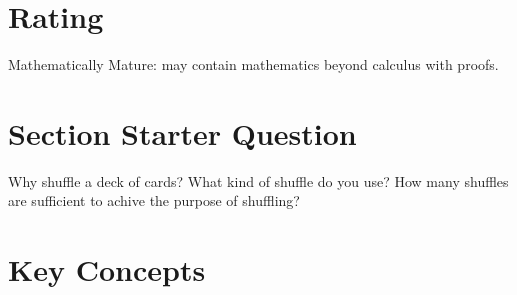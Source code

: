 \documentclass[12pt]{article}
\begin{document}
\myheader \mytitle

\hr


\hr

\usefirefox

\hr



\section*{Rating} %
Mathematically Mature:  may contain mathematics beyond calculus with
proofs. %

\hr

\section*{Section Starter Question}

Why shuffle a deck of cards?  What kind of shuffle do you use?  How
many shuffles are sufficient to achive the purpose of shuffling?

\hr

\section*{Key Concepts}
\end{document}
